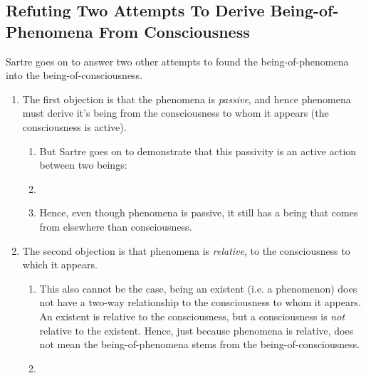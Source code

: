 \subsection{Refuting Two Attempts To Derive Being-of-Phenomena From Consciousness}
Sartre goes on to answer two other attempts to found the being-of-phenomena into the being-of-consciousness.
\begin{enumerate}
  \item The first objection is that the phenomena is \emph{passive}, and hence phenomena must derive it's being from the consciousness to whom it appears (the consciousness is active).
  \begin{enumerate}
    \item But Sartre goes on to demonstrate that this passivity is an active action between two beings:
    \item {}
    \item Hence, even though phenomena is passive, it still has a being that comes from elsewhere than consciousness.
  \end{enumerate}
  \item The second objection is that phenomena is \emph{relative}, to the consciousness to which it appears.  
  \begin{enumerate}
    \item This also cannot be the case, being an existent (i.e. a phenomenon) does not have a two-way relationship to the consciousness to whom it appears. An existent is relative to the consciousness, but a consciousness is \emph{not} relative to the existent. Hence, just because phenomena is relative, does not mean the being-of-phenomena stems from the being-of-consciousness.
    \item {}
  \end{enumerate}
\end{enumerate}

